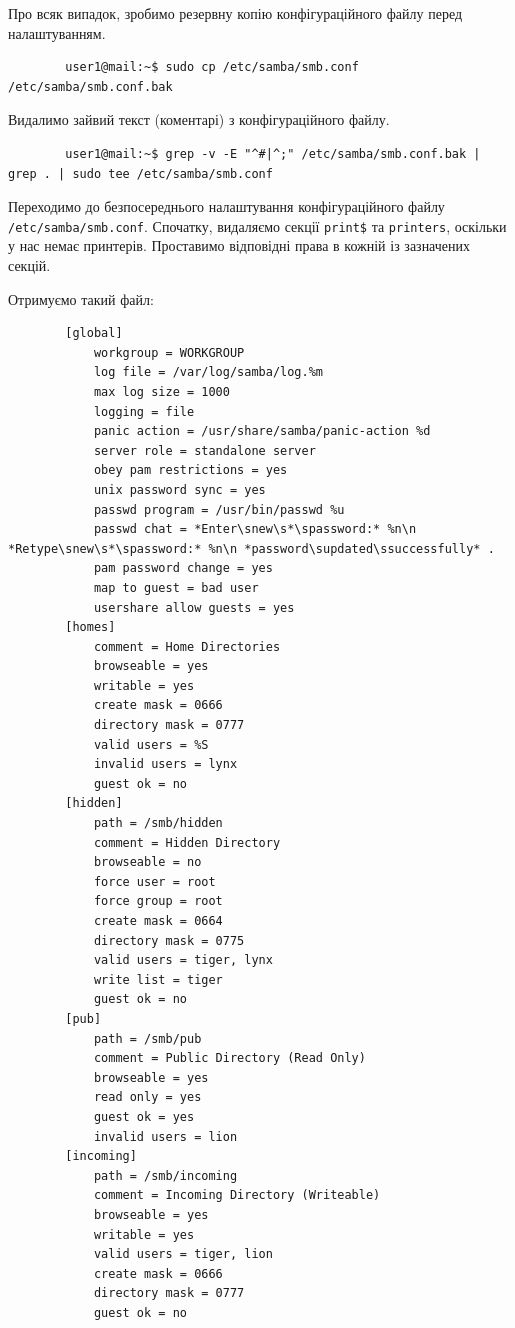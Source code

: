 \documentclass[14pt, a4paper]{extreport}
\begin{document}
	
	Про всяк випадок, зробимо резервну копію конфігураційного файлу перед налаштуванням. \sideat{[VM 1]}
	
	\begin{verbatim}
		user1@mail:~$ sudo cp /etc/samba/smb.conf /etc/samba/smb.conf.bak
	\end{verbatim}
	
	Видалимо зайвий текст (коментарі) з конфігураційного файлу. \sideat{[VM 1]}
	
	\begin{verbatim}
		user1@mail:~$ grep -v -E "^#|^;" /etc/samba/smb.conf.bak | grep . | sudo tee /etc/samba/smb.conf
	\end{verbatim}
	
	Переходимо до безпосереднього налаштування конфігураційного файлу \texttt{/etc/samba/smb.conf}. Спочатку, видаляємо секції \texttt{print\$} та \texttt{printers}, оскільки у нас немає принтерів. Проставимо відповідні права в кожній із зазначених секцій.
	
	\pagebreak
	
	Отримуємо такий файл: \sideat{[VM 1]}
	
	\begin{verbatim}
		[global]
			workgroup = WORKGROUP
			log file = /var/log/samba/log.%m
			max log size = 1000
			logging = file
			panic action = /usr/share/samba/panic-action %d
			server role = standalone server
			obey pam restrictions = yes
			unix password sync = yes
			passwd program = /usr/bin/passwd %u
			passwd chat = *Enter\snew\s*\spassword:* %n\n *Retype\snew\s*\spassword:* %n\n *password\supdated\ssuccessfully* .
			pam password change = yes
			map to guest = bad user
			usershare allow guests = yes
		[homes]
			comment = Home Directories
			browseable = yes
			writable = yes
			create mask = 0666
			directory mask = 0777
			valid users = %S
			invalid users = lynx
			guest ok = no
		[hidden]
			path = /smb/hidden
			comment = Hidden Directory
			browseable = no
			force user = root
			force group = root
			create mask = 0664
			directory mask = 0775
			valid users = tiger, lynx
			write list = tiger
			guest ok = no
		[pub]
			path = /smb/pub
			comment = Public Directory (Read Only)
			browseable = yes
			read only = yes
			guest ok = yes
			invalid users = lion
		[incoming]
			path = /smb/incoming
			comment = Incoming Directory (Writeable)
			browseable = yes
			writable = yes
			valid users = tiger, lion
			create mask = 0666
			directory mask = 0777
			guest ok = no
	\end{verbatim}
	
\end{document}
